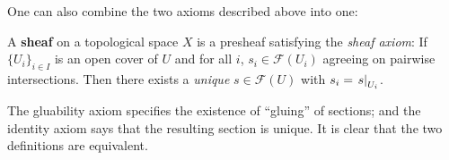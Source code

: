 \documentclass{article}
\begin{document}
\textstart
One can also combine the two axioms described above into one:

\begin{definition}
    A \textbf{sheaf} on a topological space $X$ is a presheaf satisfying the \emph{sheaf axiom}: If $\{ U_i \}_{i \in I}$ is an open cover of $U$ and for all $i$, $s_i \in \mathcal{F}(U_i)$ agreeing on pairwise intersections. Then there exists a \emph{unique} $s \in \mathcal{F}(U)$ with $s_i = \left.s\right|_{U_i}$.
\end{definition}

\begin{remark}
    The gluability axiom specifies the existence of ``gluing'' of sections; and the identity axiom says that the resulting section is unique. It is clear that the two definitions are equivalent.
\end{remark}
\end{document}
